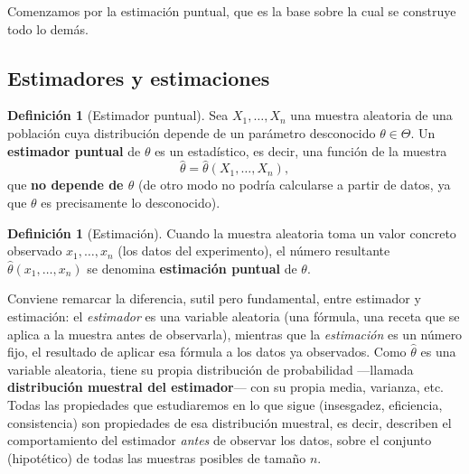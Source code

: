 \documentclass[11pt,a4paper]{article}
\theoremstyle{plain}
\theoremstyle{definition}
\newtheorem{definicion}[teorema]{Definición}
\theoremstyle{remark}
\begin{document}
Comenzamos por la estimación puntual, que es la base sobre la cual se construye todo lo demás.

\subsection{Estimadores y estimaciones}

\begin{definicion}[Estimador puntual]
Sea $X_1,\dots,X_n$ una muestra aleatoria de una población cuya distribución depende de un parámetro desconocido $\theta \in \Theta$. Un \textbf{estimador puntual} de $\theta$ es un estadístico, es decir, una función de la muestra
\[
\widehat\theta = \widehat\theta(X_1,\dots,X_n),
\]
que \textbf{no depende de $\theta$} (de otro modo no podría calcularse a partir de datos, ya que $\theta$ es precisamente lo desconocido).
\end{definicion}

\begin{definicion}[Estimación]
Cuando la muestra aleatoria toma un valor concreto observado $x_1,\dots,x_n$ (los datos del experimento), el número resultante $\widehat\theta(x_1,\dots,x_n)$ se denomina \textbf{estimación puntual} de $\theta$.
\end{definicion}

Conviene remarcar la diferencia, sutil pero fundamental, entre estimador y estimación: el \emph{estimador} es una variable aleatoria (una fórmula, una receta que se aplica a la muestra antes de observarla), mientras que la \emph{estimación} es un número fijo, el resultado de aplicar esa fórmula a los datos ya observados. Como $\widehat\theta$ es una variable aleatoria, tiene su propia distribución de probabilidad —llamada \textbf{distribución muestral del estimador}— con su propia media, varianza, etc. Todas las propiedades que estudiaremos en lo que sigue (insesgadez, eficiencia, consistencia) son propiedades de esa distribución muestral, es decir, describen el comportamiento del estimador \emph{antes} de observar los datos, sobre el conjunto (hipotético) de todas las muestras posibles de tamaño $n$.
\end{document}
